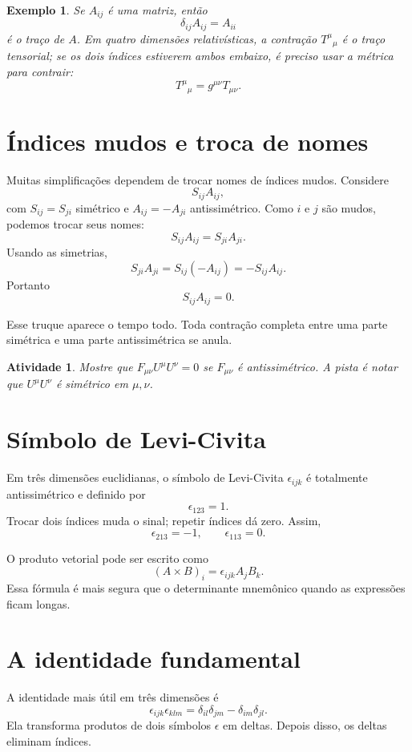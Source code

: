 \documentclass[12pt,a4paper,oneside]{book}
\theoremstyle{rgplain}
\newtheorem{example}{Exemplo}[chapter]
\newtheorem{activity}{Atividade}[chapter]
\theoremstyle{rgremark}
\begin{document}
\begin{example}
Se $A_{ij}$ é uma matriz, então
\[
  \delta_{ij}A_{ij}=A_{ii}
\]
é o traço de $A$. Em quatro dimensões relativísticas, a contração
$T^\mu{}_\mu$ é o traço tensorial; se os dois índices estiverem ambos embaixo,
é preciso usar a métrica para contrair:
\[
  T^\mu{}_\mu=g^{\mu\nu}T_{\mu\nu}.
\]
\end{example}

\section{Índices mudos e troca de nomes}

Muitas simplificações dependem de trocar nomes de índices mudos. Considere
\[
  S_{ij}A_{ij},
\]
com $S_{ij}=S_{ji}$ simétrico e $A_{ij}=-A_{ji}$ antissimétrico. Como $i$ e
$j$ são mudos, podemos trocar seus nomes:
\[
  S_{ij}A_{ij}=S_{ji}A_{ji}.
\]
Usando as simetrias,
\[
  S_{ji}A_{ji}=S_{ij}(-A_{ij})=-S_{ij}A_{ij}.
\]
Portanto
\[
  S_{ij}A_{ij}=0.
\]

Esse truque aparece o tempo todo. Toda contração completa entre uma parte
simétrica e uma parte antissimétrica se anula.

\begin{activity}
Mostre que $F_{\mu\nu}U^\mu U^\nu=0$ se $F_{\mu\nu}$ é antissimétrico. A pista
é notar que $U^\mu U^\nu$ é simétrico em $\mu,\nu$.
\end{activity}

\section{Símbolo de Levi-Civita}

Em três dimensões euclidianas, o símbolo de Levi-Civita $\epsilon_{ijk}$ é
totalmente antissimétrico e definido por
\[
  \epsilon_{123}=1.
\]
Trocar dois índices muda o sinal; repetir índices dá zero. Assim,
\[
  \epsilon_{213}=-1,
  \qquad
  \epsilon_{113}=0.
\]

O produto vetorial pode ser escrito como
\[
  (A\times B)_i=\epsilon_{ijk}A_jB_k.
\]
Essa fórmula é mais segura que o determinante mnemônico quando as expressões
ficam longas.

\section{A identidade fundamental}

A identidade mais útil em três dimensões é
\[
  \epsilon_{ijk}\epsilon_{klm}
  =
  \delta_{il}\delta_{jm}
  -
  \delta_{im}\delta_{jl}.
\]
Ela transforma produtos de dois símbolos $\epsilon$ em deltas. Depois disso,
os deltas eliminam índices.
\end{document}
